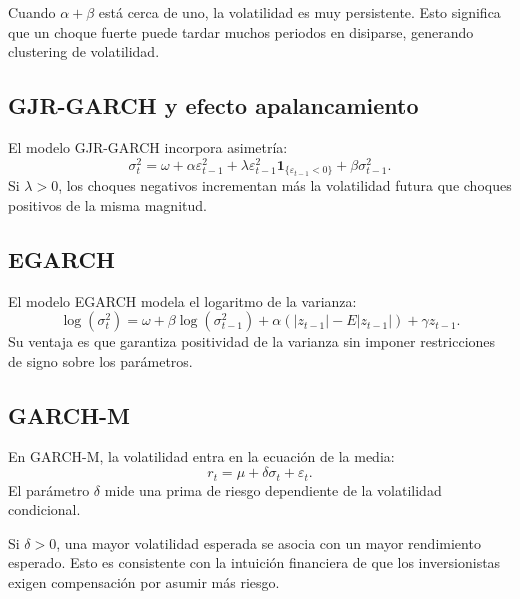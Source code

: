 \documentclass[11pt,letterpaper]{article}
\begin{document}
\begin{interpretacion}
Cuando \(\alpha+\beta\) está cerca de uno, la volatilidad es muy persistente. Esto significa que un choque fuerte puede tardar muchos periodos en disiparse, generando clustering de volatilidad.
\end{interpretacion}

\subsection{GJR-GARCH y efecto apalancamiento}

\begin{latexcell}
El modelo GJR-GARCH incorpora asimetría:
\[
\sigma_t^2=\omega+\alpha\varepsilon_{t-1}^2
+\lambda\varepsilon_{t-1}^2\mathbf{1}_{\{\varepsilon_{t-1}<0\}}
+\beta\sigma_{t-1}^2.
\]
Si \(\lambda>0\), los choques negativos incrementan más la volatilidad futura que choques positivos de la misma magnitud.
\end{latexcell}

\subsection{EGARCH}

\begin{latexcell}
El modelo EGARCH modela el logaritmo de la varianza:
\[
\log(\sigma_t^2)=\omega+\beta\log(\sigma_{t-1}^2)
+\alpha\left(\left|z_{t-1}\right|-E|z_{t-1}|\right)+\gamma z_{t-1}.
\]
Su ventaja es que garantiza positividad de la varianza sin imponer restricciones de signo sobre los parámetros.
\end{latexcell}

\subsection{GARCH-M}

\begin{latexcell}
En GARCH-M, la volatilidad entra en la ecuación de la media:
\[
r_t=\mu+\delta\sigma_t+\varepsilon_t.
\]
El parámetro \(\delta\) mide una prima de riesgo dependiente de la volatilidad condicional.
\end{latexcell}

\begin{interpretacion}
Si \(\delta>0\), una mayor volatilidad esperada se asocia con un mayor rendimiento esperado. Esto es consistente con la intuición financiera de que los inversionistas exigen compensación por asumir más riesgo.
\end{interpretacion}
\end{document}
